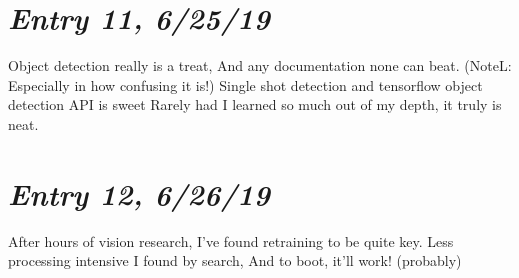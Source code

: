 \documentclass{article}
\begin{document}
\section{\Large \itshape Entry 11, 6/25/19}
    Object detection really is a treat,
\newline
And any documentation none can beat. (NoteL: Especially in how confusing it is!)
\newline
Single shot detection and tensorflow object detection API is sweet
\newline
Rarely had I learned so much out of my depth, it truly is neat.

\section{\Large \itshape Entry 12, 6/26/19}
    After hours of vision research,
\newline
I've found retraining to be quite key.
\newline
Less processing intensive I found by search,
\newline
And to boot, it'll work! (probably)
\end{document}
